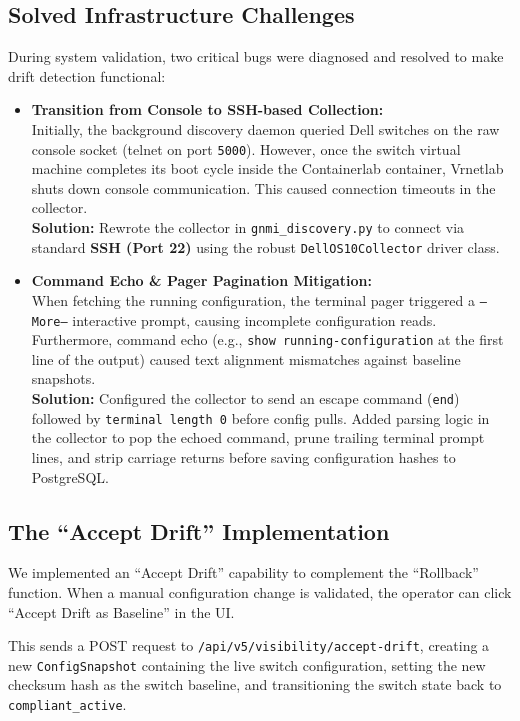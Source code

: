 \documentclass[11pt,a4paper]{article}
\begin{document}
\subsection{Solved Infrastructure Challenges}
During system validation, two critical bugs were diagnosed and resolved to make drift detection functional:
\begin{itemize}
    \item \textbf{Transition from Console to SSH-based Collection:} \\
    Initially, the background discovery daemon queried Dell switches on the raw console socket (telnet on port \texttt{5000}). However, once the switch virtual machine completes its boot cycle inside the Containerlab container, Vrnetlab shuts down console communication. This caused connection timeouts in the collector. \\
    \textbf{Solution:} Rewrote the collector in \texttt{gnmi\_discovery.py} to connect via standard \textbf{SSH (Port 22)} using the robust \texttt{DellOS10Collector} driver class.
    
    \item \textbf{Command Echo \& Pager Pagination Mitigation:} \\
    When fetching the running configuration, the terminal pager triggered a \texttt{--More--} interactive prompt, causing incomplete configuration reads. Furthermore, command echo (e.g., \texttt{show running-configuration} at the first line of the output) caused text alignment mismatches against baseline snapshots. \\
    \textbf{Solution:} Configured the collector to send an escape command (\texttt{end}) followed by \texttt{terminal length 0} before config pulls. Added parsing logic in the collector to pop the echoed command, prune trailing terminal prompt lines, and strip carriage returns before saving configuration hashes to PostgreSQL.
\end{itemize}

\subsection{The ``Accept Drift'' Implementation}
We implemented an ``Accept Drift'' capability to complement the ``Rollback'' function. When a manual configuration change is validated, the operator can click ``Accept Drift as Baseline'' in the UI. 

This sends a POST request to \texttt{/api/v5/visibility/accept-drift}, creating a new \texttt{ConfigSnapshot} containing the live switch configuration, setting the new checksum hash as the switch baseline, and transitioning the switch state back to \texttt{compliant\_active}.
\end{document}
